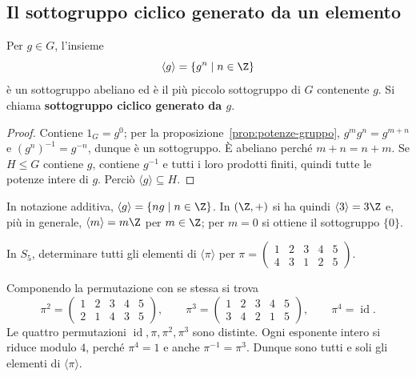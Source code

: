 \subsection{Il sottogruppo ciclico generato da un elemento}
\begin{proposizione}\label{prop:ciclico}
Per $g\in G$, l'insieme
\[
\langle g\rangle=\{g^n\mid n\in\Z\}
\]
è un sottogruppo abeliano ed è il più piccolo sottogruppo di $G$ contenente $g$. Si chiama \textbf{sottogruppo ciclico generato da $g$}.
\end{proposizione}
\begin{proof}
Contiene $1_G=g^0$; per la proposizione~\ref{prop:potenze-gruppo}, $g^mg^n=g^{m+n}$ e $(g^n)^{-1}=g^{-n}$, dunque è un sottogruppo. È abeliano perché $m+n=n+m$. Se $H\le G$ contiene $g$, contiene $g^{-1}$ e tutti i loro prodotti finiti, quindi tutte le potenze intere di $g$. Perciò $\langle g\rangle\subseteq H$.
\end{proof}

\begin{esempio}
In notazione additiva, $\langle g\rangle=\{ng\mid n\in\Z\}$. In $(\Z,+)$ si ha quindi $\langle3\rangle=3\Z$ e, più in generale, $\langle m\rangle=m\Z$ per $m\in\Z$; per $m=0$ si ottiene il sottogruppo $\{0\}$.
\end{esempio}

\begin{esercizio}
In $S_5$, determinare tutti gli elementi di $\langle\pi\rangle$ per
$\pi=\left(\begin{smallmatrix}1&2&3&4&5\\4&3&1&2&5\end{smallmatrix}\right)$.
\end{esercizio}
\begin{svolgimento}
Componendo la permutazione con se stessa si trova
\[
\pi^2=\begin{pmatrix}1&2&3&4&5\\2&1&4&3&5\end{pmatrix},\qquad
\pi^3=\begin{pmatrix}1&2&3&4&5\\3&4&2&1&5\end{pmatrix},\qquad
\pi^4=\operatorname{id}.
\]
Le quattro permutazioni $\operatorname{id},\pi,\pi^2,\pi^3$ sono distinte. Ogni esponente intero si riduce modulo $4$, perché $\pi^4=1$ e anche $\pi^{-1}=\pi^3$. Dunque sono tutti e soli gli elementi di $\langle\pi\rangle$.
\end{svolgimento}
